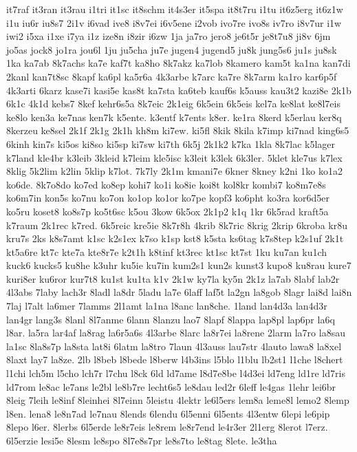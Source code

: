 {it7raf
it3ran
it3rau
i1tri
it1sc
it8schm
it4s3er
it5spa
it8t7ru
i1tu
it6z5erg
it6z1w
i1u
iu6r
iu8s7
2i1v
i6vad
ive8
i8v7ei
i6v5ene
i2vob
ivo7re
ivo8s
iv7ro
i8v7ur
i1w
iwi2
i5xa
i1xe
i7ya
i1z
ize8n
i8zir
i6zw
1ja
ja7ro
jero8
je6t5r
je8t7u8
ji8v
6jm
jo5as
jock8
jo1ra
jou6l
1ju
ju5cha
ju7e
jugen4
jugend5
ju8k
jung5s6
ju1s
ju8sk
1ka
ka7ab
8k7achs
ka7e
kaf7t
ka8ho
8k7akz
ka7lob
8kamero
kam5t
ka1na
kan7di
2kanl
kan7t8sc
8kapf
ka6pl
ka5r6a
4k3arbe
k7arc
ka7re
8k7arm
ka1ro
kar6p5f
4k3arti
6karz
kase7i
kasi5e
kas8t
ka7sta
ka6teb
kauf6s
k5auss
kau3t2
kazi8e
2k1b
6k1c
4k1d
kebs7
8kef
kehr6s5a
8k7eic
2k1eig
6k5ein
6k5eis
kel7a
ke8lat
ke8l7eis
ke8lo
ken3a
ke7nas
ken7k
k5ente.
k3entf
k7ents
k8er.
ke1ra
8kerd
k5erlau
ker8q
8kerzeu
ke8sel
2k1f
2k1g
2k1h
kh8m
ki7ew.
ki5fl
8kik
8kila
k7imp
ki7nad
king6s5
6kinh
kin7s
ki5os
ki8so
ki5sp
ki7sw
ki7th
6k5j
2k1k2
k7ka
1kla
8k7lac
k5lager
k7land
kle4br
k3leib
3kleid
k7leim
kle5isc
k3leit
k3lek
6k3ler.
5klet
kle7us
k7lex
8klig
5k2lim
k2lin
5klip
k7lot.
7k7ly
2k1m
kmani7e
6kner
8kney
k2ni
1ko
ko1a2
ko6de.
8k7o8do
ko7ed
ko8ep
kohi7
ko1i
ko8ie
koi8t
kol8kr
kombi7
ko8m7e8s
ko6m7in
kon5s
ko7nu
ko7on
ko1op
ko1or
ko7pe
kopf3
ko6pht
ko3ra
kor6d5er
ko5ru
koset8
ko8s7p
ko5t6sc
k5ou
3kow
6k5ox
2k1p2
k1q
1kr
6k5rad
kraft5a
k7raum
2k1rec
k7red.
6k5reic
kre5ie
8k7r8h
4krib
8k7ric
8krig
2krip
6kroba
kr8u
kru7s
2ks
k8s7amt
k1sc
k2s1ex
k7so
k1sp
kst8
k5sta
ks6tag
k7s8tep
k2s1uf
2k1t
kt5a6re
kt7c
kte7a
kte8r7e
k2t1h
k8tinf
kt3rec
kt1sc
kt7st
1ku
ku7an
ku1ch
kuck6
kucks5
ku8he
k3uhr
ku5ie
ku7in
kum2s1
kun2s
kunst3
kupo8
ku8rau
kure7
kuri8er
ku6ror
kur7t8
ku1st
ku1ta
k1v
2k1w
ky7la
ky5n
2k1z
la7ab
8labf
lab2r
4l3abs
7laby
lach3r
8ladl
la8dr
5ladu
la7e
6laff
laf5t
la2gn
la8gob
8lagr
lai8d
lai8n
7laj
l7alt
la6mer
7lamms
2l1amt
la1na
l8anc
lan8che.
1land
lan4d3a
lan4d3r
lan4gr
lang3s
8lanl
8l7anme
6lann
8lanzu
lao7
8lapf
8lappa
lap8pl
lap6pr
la6q
l8ar.
la5ra
lar4af
la8rag
la6r5a6s
4l3arbe
8larc
la8r7ei
la8rene
2larm
la7ro
la8sau
la1sc
8la8s7p
la8sta
lat8i
6latm
la8tro
7laun
4l3auss
lau7str
4lauto
lawa8
la8xel
8laxt
lay7
la8ze.
2lb
l8beb
l8bede
l8berw
l4b3ins
l5blo
l1blu
lb2st1
l1che
l8chert
l1chi
lch5m
l5cho
lch7r
l7chu
l8ck
6ld
ld7ame
l8d7e8be
l4d3ei
ld7eng
ld1re
ld7ris
ld7rom
le8ac
le7ans
le2bl
le8b7re
lecht6s5
le8dau
led2r
6leff
le4gas
1lehr
lei6br
8leig
7leih
le8inf
8leinhei
8l7einn
5leistu
4lektr
le6l5ers
lem8a
leme8l
lemo2
8lemp
l8en.
lena8
le8n7ad
le7nau
8lends
6lendu
6l5enni
6l5ents
4l3entw
6lepi
le6pip
8lepo
l6er.
8lerbs
6l5erde
le8r7eis
le8rem
le8r7end
le4r3er
2l1erg
8lerot
l7erz.
6l5erzie
lesi5e
8lesm
le8spo
8l7e8s7pr
le8s7to
le8tag
8lete.
le3tha
}
